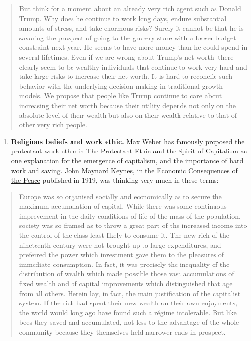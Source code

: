 \documentclass[]{book}
\providecommand{\tightlist}{%
  \setlength{\itemsep}{0pt}\setlength{\parskip}{0pt}}
\theoremstyle{definition}
\theoremstyle{definition}
\theoremstyle{definition}
\theoremstyle{remark}
\begin{document}
\begin{quote}
But think for a moment about an already very rich agent such as Donald
Trump. Why does he continue to work long days, endure substantial
amounts of stress, and take enormous risks? Surely it cannot be that he
is savoring the prospect of going to the grocery store with a looser
budget constraint next year. He seems to have more money than he could
spend in several lifetimes. Even if we are wrong about Trump's net
worth, there clearly seem to be wealthy individuals that continue to
work very hard and take large risks to increase their net worth. It is
hard to reconcile such behavior with the underlying decision making in
traditional growth models. We propose that people like Trump continue to
care about increasing their net worth because their utility depends not
only on the absolute level of their wealth but also on their wealth
relative to that of other very rich people.
\end{quote}

\begin{enumerate}
\def\labelenumi{\arabic{enumi}.}
\setcounter{enumi}{3}
\tightlist
\item
  \textbf{Religious beliefs and work ethic.} Max Weber has famously
  proposed the protestant work ethic in
  \href{https://en.wikipedia.org/wiki/The_Protestant_Ethic_and_the_Spirit_of_Capitalism}{The
  Protestant Ethic and the Spirit of Capitalism} as one explanation for
  the emergence of capitalism, and the importance of hard work and
  saving. John Maynard Keynes, in the
  \href{https://socialsciences.mcmaster.ca/econ/ugcm/3ll3/keynes/pdf\%26filename\%3Dpeace3.pdf}{Economic
  Consequences of the Peace} published in 1919, was thinking very much
  in these terms:
\end{enumerate}

\begin{quote}
Europe was so organised socially and economically as to secure the
maximum accumulation of capital. While there was some continuous
improvement in the daily conditions of life of the mass of the
population, society was so framed as to throw a great part of the
increased income into the control of the class least likely to consume
it. The new rich of the nineteenth century were not brought up to large
expenditures, and preferred the power which investment gave them to the
pleasures of immediate consumption. In fact, it was precisely the
inequality of the distribution of wealth which made possible those vast
accumulations of fixed wealth and of capital improvements which
distinguished that age from all others. Herein lay, in fact, the main
justification of the capitalist system. If the rich had spent their new
wealth on their own enjoyments, the world would long ago have found such
a régime intolerable. But like bees they saved and accumulated, not less
to the advantage of the whole community because they themselves held
narrower ends in prospect.
\end{quote}
\end{document}
